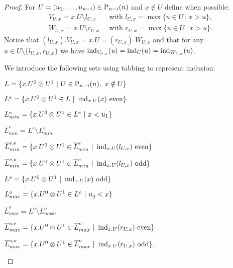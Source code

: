 \begin{proof}
	For $U = (u_1, \dots, u_{n-i}) \in \P_{n-i}(n)$ and $x \notin U$ define when possible:
	\begin{align*}
	V_{U,x} = x.U \setminus l_{U, x} & \ \text{ with } l_{U,x} = \max\{u\in U\ |\ x>u\}, \\
	W_{U,x} = x.U \setminus r_{U, x} & \ \text{ with } r_{U,x} = \max\{u \in U\ |\ x>u\}.
	\end{align*}
	Notice that $(l_{U,x}).V_{U,x} = x.U = (r_{U,x}).W_{U,x}$ and that for any $u \in U \setminus \{l_{U,x}, r_{U,x}\}$ we have $\ind_{V_{U,x}}(u) = \ind_{U}(u) = \ind_{W_{U,x}}(u)$.

	We introduce the following sets using tabbing to represent inclusion:

	\vspace*{5pt}
	$L = \{x.U^0 \ot U^1\ | \ U \in \P_{n-i}(n),\ x \notin U\}$
	\vspace*{1pt}
	\begin{tab}
		$L^{e} = \{x.U^0 \ot U^1 \in L\ | \ \ind_{x.U}(x) \text{ even}\}$
		\begin{tab}
			$L_{min}^{e} = \{x.U^0 \ot U^1 \in L^e\ | \ x < u_1 \}$ \par
			$\overline{L}_{min}^{e} = L^{e} \setminus L_{min}^{e}$
			\begin{tab}
				$\overline{L}_{min}^{e,e} = \{ x.U^0 \ot U^1 \in \overline{L}_{min}^{e}\ | \ \ind_{x.U}(l_{U,x}) \text{ even} \}$ \par
				$\overline{L}_{min}^{e,o} = \{ x.U^0 \ot U^1 \in \overline{L}_{min}^{e}\ | \ \ind_{x.U}(l_{U,x}) \text{ odd} \}$
				\vspace*{7pt}
			\end{tab}
		\end{tab}
		$L^{o} = \{x.U^0 \ot U^1\ | \ \ind_{x.U}(x) \text{ odd}\}$ \par
		\begin{tab}
			$L_{max}^{o} = \{x.U^0 \ot U^1 \in L^o\ | \ u_q < x \}$ \par
			$\overline{L}_{max}^{o} = L^{o}\setminus L_{max}^{o}$.
			\begin{tab}
				$\overline{L}_{max}^{o,e} = \{ x.U^0 \ot U^1 \in \overline{L}_{max}^{o}\ | \ \ind_{x.U}(r_{U,x}) \text{ even} \}$ \par
				$\overline{L}_{max}^{o,o} = \{ x.U^0 \ot U^1 \in \overline{L}_{max}^{o}\ | \ \ind_{x.U}(r_{U,x}) \text{ odd} \}$.
			\end{tab}
		\end{tab}
	\end{tab}


\end{proof}
